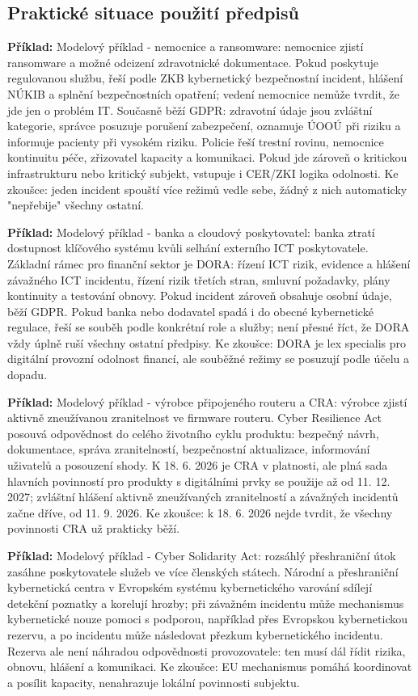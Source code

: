 \documentclass[11pt,a4paper]{article}
\newcommand{\priklad}[1]{\begin{tcolorbox}[breakable,enhanced,colback=green!7,colframe=green!30!black,boxrule=0pt,arc=1mm,left=5pt,right=5pt,top=5pt,bottom=5pt,before skip=6pt,after skip=6pt]\textbf{Příklad:} #1\end{tcolorbox}}
\begin{document}
\subsection*{Praktické situace použití předpisů}
\priklad{Modelový příklad - nemocnice a ransomware: nemocnice zjistí ransomware a možné odcizení zdravotnické dokumentace. Pokud poskytuje regulovanou službu, řeší podle ZKB kybernetický bezpečnostní incident, hlášení NÚKIB a splnění bezpečnostních opatření; vedení nemocnice nemůže tvrdit, že jde jen o problém IT. Současně běží GDPR: zdravotní údaje jsou zvláštní kategorie, správce posuzuje porušení zabezpečení, oznamuje ÚOOÚ při riziku a informuje pacienty při vysokém riziku. Policie řeší trestní rovinu, nemocnice kontinuitu péče, zřizovatel kapacity a komunikaci. Pokud jde zároveň o kritickou infrastrukturu nebo kritický subjekt, vstupuje i CER/ZKI logika odolnosti. Ke zkoušce: jeden incident spouští více režimů vedle sebe, žádný z nich automaticky "nepřebije" všechny ostatní.}

\priklad{Modelový příklad - banka a cloudový poskytovatel: banka ztratí dostupnost klíčového systému kvůli selhání externího ICT poskytovatele. Základní rámec pro finanční sektor je DORA: řízení ICT rizik, evidence a hlášení závažného ICT incidentu, řízení rizik třetích stran, smluvní požadavky, plány kontinuity a testování obnovy. Pokud incident zároveň obsahuje osobní údaje, běží GDPR. Pokud banka nebo dodavatel spadá i do obecné kybernetické regulace, řeší se souběh podle konkrétní role a služby; není přesné říct, že DORA vždy úplně ruší všechny ostatní předpisy. Ke zkoušce: DORA je lex specialis pro digitální provozní odolnost financí, ale souběžné režimy se posuzují podle účelu a dopadu.}

\priklad{Modelový příklad - výrobce připojeného routeru a CRA: výrobce zjistí aktivně zneužívanou zranitelnost ve firmware routeru. Cyber Resilience Act posouvá odpovědnost do celého životního cyklu produktu: bezpečný návrh, dokumentace, správa zranitelností, bezpečnostní aktualizace, informování uživatelů a posouzení shody. K 18. 6. 2026 je CRA v platnosti, ale plná sada hlavních povinností pro produkty s digitálními prvky se použije až od 11. 12. 2027; zvláštní hlášení aktivně zneužívaných zranitelností a závažných incidentů začne dříve, od 11. 9. 2026. Ke zkoušce: k 18. 6. 2026 nejde tvrdit, že všechny povinnosti CRA už prakticky běží.}

\priklad{Modelový příklad - Cyber Solidarity Act: rozsáhlý přeshraniční útok zasáhne poskytovatele služeb ve více členských státech. Národní a přeshraniční kybernetická centra v Evropském systému kybernetického varování sdílejí detekční poznatky a korelují hrozby; při závažném incidentu může mechanismus kybernetické nouze pomoci s podporou, například přes Evropskou kybernetickou rezervu, a po incidentu může následovat přezkum kybernetického incidentu. Rezerva ale není náhradou odpovědnosti provozovatele: ten musí dál řídit rizika, obnovu, hlášení a komunikaci. Ke zkoušce: EU mechanismus pomáhá koordinovat a posílit kapacity, nenahrazuje lokální povinnosti subjektu.}
\end{document}
